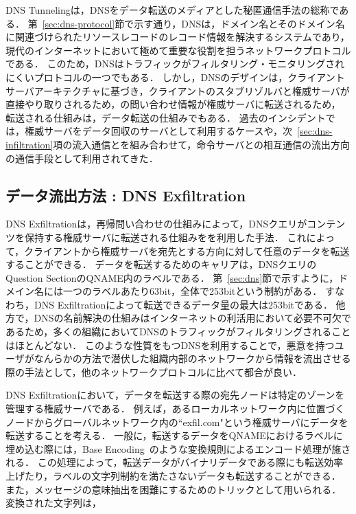 


DNS Tunnelingは，DNSをデータ転送のメディアとした秘匿通信手法の総称である．
第~\ref{sec:dns-protocol}節で示す通り，DNSは，ドメイン名とそのドメイン名に関連づけられたリソースレコードのレコード情報を解決するシステムであり，現代のインターネットにおいて極めて重要な役割を担うネットワークプロトコルである．
このため，DNSはトラフィックがフィルタリング・モニタリングされにくいプロトコルの一つでもある．
しかし，DNSのデザインは，クライアントサーバアーキテクチャに基づき，クライアントのスタブリゾルバと権威サーバが直接やり取りされるため，の問い合わせ情報が権威サーバに転送されるため，
転送される仕組みは，データ転送の仕組みでもある．
過去のインシデントでは，権威サーバをデータ回収のサーバとして利用するケースや，次~\ref{sec:dns-infiltration}項の流入通信とを組み合わせて，命令サーバとの相互通信の流出方向の通信手段として利用されてきた．

\subsection{データ流出方法 : DNS Exfiltration}
\label{sec:dns-exfiltration}
DNS Exfiltrationは，再帰問い合わせの仕組みによって，DNSクエリがコンテンツを保持する権威サーバに転送される仕組みをを利用した手法．
これによって，クライアントから権威サーバを宛先とする方向に対して任意のデータを転送することができる．
データを転送するためのキャリアは，DNSクエリのQuestion SectionのQNAME内のラベルである．
第~\ref{sec:dns}節で示すように，ドメイン名には一つのラベルあたり63bit，全体で253bitという制約がある．
すなわち，DNS Exfiltrationによって転送できるデータ量の最大は253bitである．
他方で，DNSの名前解決の仕組みはインターネットの利活用において必要不可欠であるため，多くの組織においてDNSのトラフィックがフィルタリングされることはほとんどない．
このような性質をもつDNSを利用することで，悪意を持つユーザがなんらかの方法で潜伏した組織内部のネットワークから情報を流出させる際の手法として，他のネットワークプロトコルに比べて都合が良い．

DNS Exfiltrationにおいて，データを転送する際の宛先ノードは特定のゾーンを管理する権威サーバである．
例えば，あるローカルネットワーク内に位置づくノードからグローバルネットワーク内の``exfil.com"という権威サーバにデータを転送することを考える．
一般に，転送するデータをQNAMEにおけるラベルに埋め込む際には，Base Encoding~\cite{rfc4648}のような変換規則によるエンコード処理が施される．
この処理によって，転送データがバイナリデータである際にも転送効率上げたり，ラベルの文字列制約を満たさないデータも転送することができる．
また，メッセージの意味抽出を困難にするためのトリックとして用いられる．
変換された文字列は，



